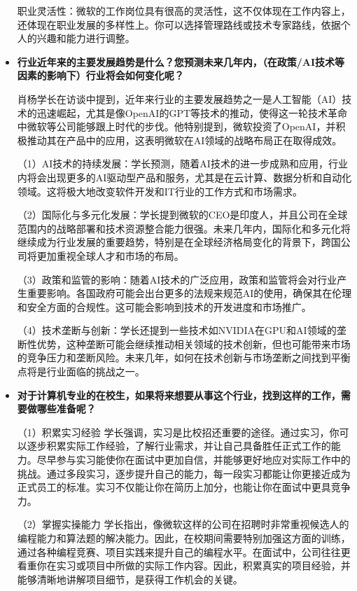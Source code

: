 \begin{itemize}
职业灵活性：微软的工作岗位具有很高的灵活性，这不仅体现在工作内容上，还体现在职业发展的多样性上。你可以选择管理路线或技术专家路线，依据个人的兴趣和能力进行调整。

    \item \textbf{行业近年来的主要发展趋势是什么？您预测未来几年内，（在政策/AI技术等因素的影响下）行业将会如何变化呢？}

    肖杨学长在访谈中提到，近年来行业的主要发展趋势之一是人工智能（AI）技术的迅速崛起，尤其是像OpenAI的GPT等技术的推动，使得这一轮技术革命中微软等公司能够跟上时代的步伐。他特别提到，微软投资了OpenAI，并积极推动其在产品中的应用，这表明微软在AI领域的战略布局正在取得成效。
    
（1）AI技术的持续发展：学长预测，随着AI技术的进一步成熟和应用，行业内将会出现更多的AI驱动型产品和服务，尤其是在云计算、数据分析和自动化领域。这将极大地改变软件开发和IT行业的工作方式和市场需求。

（2）国际化与多元化发展：学长提到微软的CEO是印度人，并且公司在全球范围内的战略部署和技术资源整合能力很强。未来几年内，国际化和多元化将继续成为行业发展的重要趋势，特别是在全球经济格局变化的背景下，跨国公司将更加重视全球人才和市场的布局。

（3）政策和监管的影响：随着AI技术的广泛应用，政策和监管将会对行业产生重要影响。各国政府可能会出台更多的法规来规范AI的使用，确保其在伦理和安全方面的合规性。这可能会影响到技术的开发进度和市场推广。

（4）技术垄断与创新：学长还提到一些技术如NVIDIA在GPU和AI领域的垄断性优势，这种垄断可能会继续推动相关领域的技术创新，但也可能带来市场的竞争压力和垄断风险。未来几年，如何在技术创新与市场垄断之间找到平衡点将是行业面临的挑战之一。

    \item \textbf{对于计算机专业的在校生，如果将来想要从事这个行业，找到这样的工作，需要做哪些准备呢？}

（1）积累实习经验
学长强调，实习是比校招还重要的途径。通过实习，你可以逐步积累实际工作经验，了解行业需求，并让自己具备胜任正式工作的能力。尽早参与实习能使你在面试中更加自信，并能够更好地应对实际工作中的挑战。通过多段实习，逐步提升自己的能力，每一段实习都能让你更接近成为正式员工的标准。实习不仅能让你在简历上加分，也能让你在面试中更具竞争力。

（2）掌握实操能力
学长指出，像微软这样的公司在招聘时非常重视候选人的编程能力和算法题的解决能力。因此，在校期间需要特别加强这方面的训练，通过各种编程竞赛、项目实践来提升自己的编程水平。在面试中，公司往往更看重你在实习或项目中所做的实际工作内容。因此，积累真实的项目经验，并能够清晰地讲解项目细节，是获得工作机会的关键。


\end{itemize}

